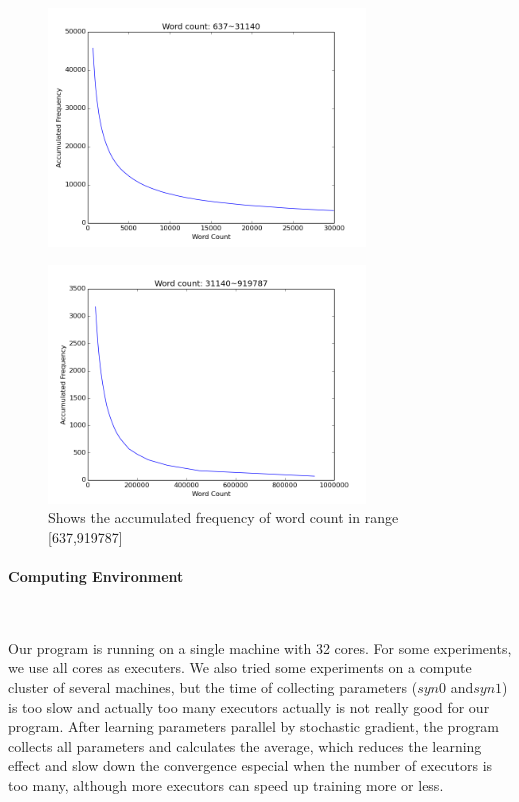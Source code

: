 \begin{figure}[H]
\centering
 	\includegraphics[width=0.75\textwidth]{637to31140} 
	\caption{Shows the accumulated frequency of word count in range [637,31140]}
	\label{fig:637to31140}
\begin{figure}[H]	
\end{figure}
\centering
	\includegraphics[width=0.75\textwidth]{31140torest} 
	\caption{Shows the accumulated frequency of word count in range [637,919787]}
	\label{fig:31140torest}
\end{figure}

\paragraph{Computing Environment} \ 

Our program is running on a single machine with 32 cores. For some experiments, we use all cores as executers. We also tried some experiments on a compute cluster of several machines, but the time of collecting parameters ($syn0$ and$syn1$) is too slow and actually too many executors actually is not really good for our program. After learning parameters parallel by stochastic gradient, the program collects all parameters and calculates the average, which reduces the learning effect and slow down the convergence especial when the number of executors is too many, although more executors can speed up training more or less.

